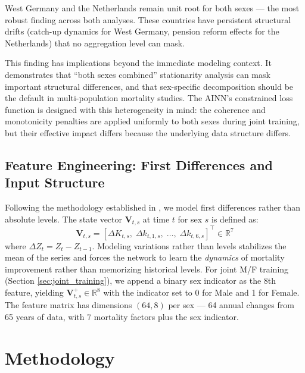 \documentclass[11pt,a4paper]{article}
\begin{document}
West Germany and the Netherlands remain unit root for both sexes --- the most robust finding across both analyses. These countries have persistent structural drifts (catch-up dynamics for West Germany, pension reform effects for the Netherlands) that no aggregation level can mask.

This finding has implications beyond the immediate modeling context. It demonstrates that ``both sexes combined'' stationarity analysis can mask important structural differences, and that sex-specific decomposition should be the default in multi-population mortality studies. The AINN's constrained loss function is designed with this heterogeneity in mind: the coherence and monotonicity penalties are applied uniformly to both sexes during joint training, but their effective impact differs because the underlying data structure differs.

\subsection{Feature Engineering: First Differences and Input Structure}

Following the methodology established in \cite{rindori2026p04}, we model first differences rather than absolute levels. The state vector $\mathbf{V}_{t,s}$ at time $t$ for sex $s$ is defined as:
\begin{equation}
    \mathbf{V}_{t,s} = \left[ \Delta K_{t,s},\; \Delta k_{t,1,s},\; \dots,\; \Delta k_{t,6,s} \right]^\top \in \mathbb{R}^{7}
\end{equation}
where $\Delta Z_t = Z_t - Z_{t-1}$. Modeling variations rather than levels stabilizes the mean of the series and forces the network to learn the \textit{dynamics} of mortality improvement rather than memorizing historical levels. For joint M/F training (Section \ref{sec:joint_training}), we append a binary sex indicator as the 8th feature, yielding $\mathbf{V}_{t,s}^+ \in \mathbb{R}^{8}$ with the indicator set to 0 for Male and 1 for Female. The feature matrix has dimensions $(64, 8)$ per sex --- 64 annual changes from 65 years of data, with 7 mortality factors plus the sex indicator.




\section{Methodology}
\end{document}
